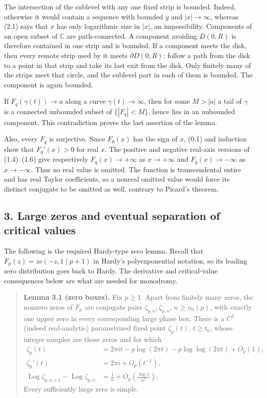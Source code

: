 \documentclass[11pt]{article}
\DeclareMathOperator{\Log}{Log}
\theoremstyle{keio}
\theoremstyle{definition}
\theoremstyle{remark}
\begin{document}
The intersection of the sublevel with any one fixed strip is bounded.
Indeed, otherwise it would contain a sequence with bounded \(y\) and
\(|x|\to\infty\), whereas (2.1) says that \(x\) has only logarithmic size in
\(|x|\), an impossibility. Components of an open subset of \(\mathbb C\)
are path-connected. A component avoiding \(\overline{D(0,R)}\) is therefore
contained in one strip and is bounded. If a component meets the disk, then
every remote strip used by it meets \(\partial D(0,R)\): follow a path from
the disk to a point in that strip and take its last exit from the disk. Only
finitely many of the strips meet that circle, and the sublevel part in each
of them is bounded. The component is again bounded.

If \(F_q(\gamma(t))\to a\) along a curve \(\gamma(t)\to\infty\), then for
some \(M>|a|\) a tail of \(\gamma\) is a connected unbounded subset of
\(\{|F_q|<M\}\), hence lies in an unbounded component. This contradiction
proves the last assertion of the lemma.

Also, every \(F_q\) is surjective. Since \(F_0(x)\) has the sign of \(x\),
(0.1) and induction show that \(F_q'(x)>0\) for real \(x\). The positive
and negative real-axis versions of (1.4)--(1.6) give respectively
\(F_q(x)\to+\infty\) as \(x\to+\infty\) and
\(F_q(x)\to-\infty\) as \(x\to-\infty\). Thus no real value is omitted.
The function is transcendental entire and has real Taylor coefficients, so
a nonreal omitted value would force its distinct conjugate to be omitted as
well, contrary to Picard's theorem.

\subsection{3. Large zeros and eventual separation of critical values}

The following is the required Hardy-type zero lemma. Recall that
\(F_p(z)=z e(-z,1\mid p+1)\) in Hardy's polyexponential notation, so its
leading zero distribution goes back to Hardy. The derivative and
critical-value consequences below are what are needed for monodromy.

\begin{quote}
\textbf{Lemma 3.1 (zero boxes).} Fix \(p\geq1\). Apart from finitely many
zeros, the nonzero zeros of \(F_p\) are conjugate pairs
\(\zeta_{p,n},\overline{\zeta_{p,n}}\), \(n\geq n_0(p)\), with exactly
one upper zero in every corresponding large phase box. There is a
\(C^1\) (indeed real-analytic) parametrized fixed point
\(\zeta_p(t)\), \(t\geq t_0\),
whose integer samples are those zeros and for which
\[
 \begin{aligned}
 \zeta_p(t)
 &=2\pi it-p\log(2\pi t)-p\log\log(2\pi t)+O_p(1),\\
 \zeta_p'(t)&=2\pi i+O_p(t^{-1}),\\
 \Log\zeta_{p,n+1}-\Log\zeta_{p,n}
 &=\frac1n+O_p\!\left(\frac{\log n}{n^2}\right).
 \end{aligned}
\tag{Inv-3.1}
\]
Every sufficiently large zero is simple.
\end{quote}
\end{document}
